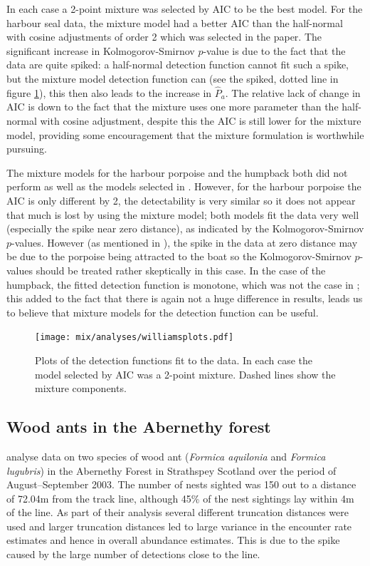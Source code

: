 \label{cor-8s11-1}In each case a 2-point mixture was selected by AIC to be the best model. For the harbour seal data, the mixture model had a better AIC than the half-normal with cosine adjustments of order 2 which was selected in the paper. \label{cor-8s11-3}The significant increase in Kolmogorov-Smirnov $p$-value is due to the fact that the data are quite spiked: a half-normal detection function cannot fit such a spike, but the mixture model detection function can (see the spiked, dotted line in figure \ref{williams-detfcts}), this then also leads to the increase in $\hat{P}_a$. The relative lack of change in AIC is down to the fact that the mixture uses one more parameter than the half-normal with cosine adjustment, despite this the AIC is still lower for the mixture model, providing some encouragement that the mixture formulation is worthwhile pursuing.

The mixture models for the harbour porpoise and the humpback both did not perform as well as the models selected in . However, for the harbour porpoise the AIC is only different by 2, the detectability is very similar so it does not appear that much is lost by using the mixture model; both models fit the data very well (especially the spike near zero distance), as indicated by the Kolmogorov-Smirnov $p$-values. However (as mentioned in ), the spike in the data at zero distance may be due to the porpoise being attracted to the boat so the Kolmogorov-Smirnov $p$-values should be treated rather skeptically in this case. In the case of the humpback, the fitted detection function is monotone, which was not the case in ; this added to the fact that there is again not a huge difference in results, leads us to believe that mixture models for the detection function can be useful. 


\begin{figure}
\centering
\texttt{[image: mix/analyses/williamsplots.pdf]}
\caption{Plots of the detection functions fit to the  data. In each case the model selected by AIC was a 2-point mixture. Dashed lines show the mixture components.}
\label{williams-detfcts}
\end{figure}


\subsection{Wood ants in the Abernethy forest}

 analyse data on two species of wood ant (\textit{Formica aquilonia} and \textit{Formica lugubris}) in the Abernethy Forest in Strathspey Scotland over the period of August--September 2003. The number of nests sighted was 150 out to a distance of 72.04m from the track line, although 45\% of the nest sightings lay within 4m of the line. As part of their analysis several different truncation distances were used and larger truncation distances led to large variance in the encounter rate estimates and hence in overall abundance estimates. This is due to the spike caused by the large number of detections close to the line.

